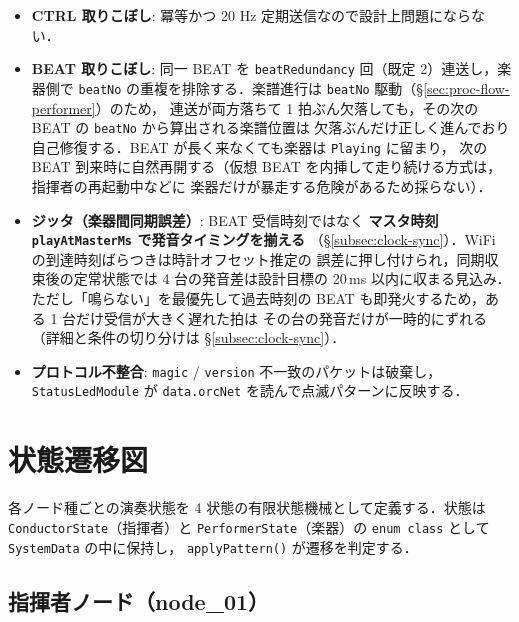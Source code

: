 \documentclass[lualatex,book,paper=a4paper,jafontsize=11.5pt,jafontscale=1.05]{jlreq}
\begin{document}
\begin{itemize}
  \item \textbf{CTRL 取りこぼし}: 冪等かつ 20 Hz 定期送信なので設計上問題にならない．
  \item \textbf{BEAT 取りこぼし}: 同一 BEAT を \texttt{beatRedundancy} 回（既定 2）連送し，楽器側で
        \texttt{beatNo} の重複を排除する．楽譜進行は \texttt{beatNo} 駆動（\S\ref{sec:proc-flow-performer}）のため，
        連送が両方落ちて 1 拍ぶん欠落しても，その次の BEAT の \texttt{beatNo} から算出される楽譜位置は
        欠落ぶんだけ正しく進んでおり自己修復する．BEAT が長く来なくても楽器は \texttt{Playing} に留まり，
        次の BEAT 到来時に自然再開する（仮想 BEAT を内挿して走り続ける方式は，指揮者の再起動中などに
        楽器だけが暴走する危険があるため採らない）．
  \item \textbf{ジッタ（楽器間同期誤差）}: BEAT 受信時刻ではなく
        \textbf{マスタ時刻 \texttt{playAtMasterMs} で発音タイミングを揃える}
        （\S\ref{subsec:clock-sync}）．WiFi の到達時刻ばらつきは時計オフセット推定の
        誤差に押し付けられ，同期収束後の定常状態では 4 台の発音差は設計目標の 20\,ms 以内に収まる見込み．
        ただし「鳴らない」を最優先して過去時刻の BEAT も即発火するため，ある 1 台だけ受信が大きく遅れた拍は
        その台の発音だけが一時的にずれる（詳細と条件の切り分けは \S\ref{subsec:clock-sync}）．
  \item \textbf{プロトコル不整合}: \texttt{magic} / \texttt{version} 不一致のパケットは破棄し，
        \texttt{StatusLedModule} が \texttt{data.orcNet} を読んで点滅パターンに反映する．
\end{itemize}


\section{状態遷移図}\label{sec:basic-state}

各ノード種ごとの演奏状態を 4 状態の有限状態機械として定義する．状態は
\texttt{ConductorState}（指揮者）と \texttt{PerformerState}（楽器）の
\texttt{enum class} として \texttt{SystemData} の中に保持し，
\texttt{applyPattern()} が遷移を判定する．

\subsection{指揮者ノード（node\_01）}
\end{document}
